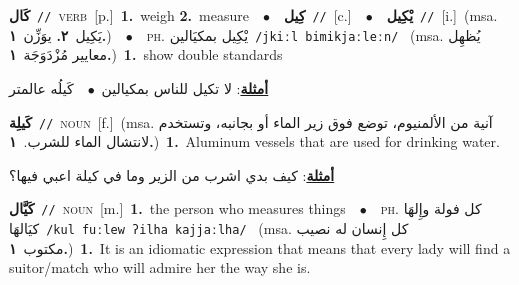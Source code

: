 \documentclass[10pt,a4paper,twoside]{article} %
\begin{document}
\begin{multicols}{2}
{\setlength\topsep{0pt}\textbf{\foreignlanguage{arabic}{كَال}}\ {\color{gray}\texttt{//}\color{black}}\ \textsc{verb}\ [p.]\ \textbf{1.}~weigh  \textbf{2.}~measure\ \ $\bullet$\ \ \setlength\topsep{0pt}\textbf{\foreignlanguage{arabic}{كِيل}}\ {\color{gray}\texttt{//}\color{black}}\ [c.]\ \ $\bullet$\ \ \setlength\topsep{0pt}\textbf{\foreignlanguage{arabic}{يْكِيل}}\ {\color{gray}\texttt{//}\color{black}}\ [i.]\ \color{gray}(msa. \foreignlanguage{arabic}{يَكِيل}~\foreignlanguage{arabic}{\textbf{٢.}}  \foreignlanguage{arabic}{يوَزِّن}~\foreignlanguage{arabic}{\textbf{١.}})\color{black}\ \ $\bullet$\ \ \textsc{ph.} \color{gray} \foreignlanguage{arabic}{يْكِيل بمكيَالين}\color{black}\ {\color{gray}\texttt{/{\sffamily jkiːl bimikjaːleːn}/}\color{black}}\ \color{gray} (msa. \foreignlanguage{arabic}{يُظهِل معايير مُزْدَوَجَة}~\foreignlanguage{arabic}{\textbf{١.}})\color{black}\ \textbf{1.}~show double standards\  \begin{flushright}\color{gray}\foreignlanguage{arabic}{\textbf{\underline{\foreignlanguage{arabic}{أمثلة}}}: لا تكيل للناس بمكيالين\ $\bullet$\ \  كَيلُه عالمتر}\end{flushright}\color{black}} \vspace{2mm}

{\setlength\topsep{0pt}\textbf{\foreignlanguage{arabic}{كَيلِة}}\ {\color{gray}\texttt{//}\color{black}}\ \textsc{noun}\ [f.]\ \color{gray}(msa. \foreignlanguage{arabic}{آنية من الألمنيوم، توضع فوق زير الماء أو بجانبه، وتستخدم لانتشال الماء للشرب.}~\foreignlanguage{arabic}{\textbf{١.}})\color{black}\ \textbf{1.}~Aluminum vessels that are used for drinking water.\  \begin{flushright}\color{gray}\foreignlanguage{arabic}{\textbf{\underline{\foreignlanguage{arabic}{أمثلة}}}: كيف بدي اشرب من الزير وما في كيلة اعبي فيها؟}\end{flushright}\color{black}} \vspace{2mm}

{\setlength\topsep{0pt}\textbf{\foreignlanguage{arabic}{كَيَّال}}\ {\color{gray}\texttt{//}\color{black}}\ \textsc{noun}\ [m.]\ \textbf{1.}~the person who measures things\ \ $\bullet$\ \ \textsc{ph.} \color{gray} \foreignlanguage{arabic}{كل فولة وإِلهَا كيَالهَا}\color{black}\ {\color{gray}\texttt{/{\sffamily kul fuːlew ʔilha kajjaːlha}/}\color{black}}\ \color{gray} (msa. \foreignlanguage{arabic}{كل إِنسان له نصيب مكتوب}~\foreignlanguage{arabic}{\textbf{١.}})\color{black}\ \textbf{1.}~It is an idiomatic expression that means that every lady will find a suitor/match who will admire her the way she is.\ } \vspace{2mm}


\end{multicols}
\end{document}
